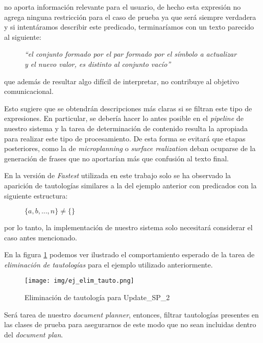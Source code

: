 \noindent
no aporta información relevante para el usuario, de hecho esta expresión no agrega ninguna restricción para el caso de prueba ya que será siempre verdadera y si intentáramos describir este predicado, terminaríamos con un texto parecido al siguiente:

\begin{figure}[H]
  \centering
  \emph{``el conjunto formado por el par formado por el símbolo a actualizar y el nuevo valor, es distinto al conjunto vacío''}
\end{figure}

\noindent
que además de resultar algo difícil de interpretar, no contribuye al objetivo comunicacional.

Esto sugiere que se obtendrán descripciones más claras si se filtran este tipo de expresiones. En particular, se debería hacer lo antes posible en el \textit{pipeline} de nuestro sistema y la tarea de determinación de contenido resulta la apropiada para realizar este tipo de procesamiento. De esta forma se evitará que etapas posteriores, como la de \emph{microplanning} o \emph{surface realization} deban ocuparse de la generación de frases que no aportarían más que confusión al texto final.

En la versión de \emph{Fastest} utilizada en este trabajo solo se ha observado la aparición de tautologías similares a la del ejemplo anterior con predicados con la siguiente estructura:

\begin{figure}[H]
  \centering
  $\{ a, b, ... , n \} \neq \{ \}$ 
\end{figure}

\noindent
por lo tanto, la implementación de nuestro sistema solo necesitará considerar el caso antes mencionado. 

En la figura \ref{fig:ej_elim_tauto} podemos ver ilustrado el comportamiento esperado de la tarea de \emph{eliminación de tautologías} para el ejemplo utilizado anteriormente.

\begin{figure}[H]
  	\centering
	\texttt{[image: img/ej\_elim\_tauto.png]}
	\caption{Eliminación de tautología para Update\_SP\_2}
  	\label{fig:ej_elim_tauto}
\end{figure}

Será tarea de nuestro \textit{document planner}, entonces, filtrar tautologías presentes en las clases de prueba para asegurarnos de este modo que no sean incluidas dentro del \emph{document plan}.

